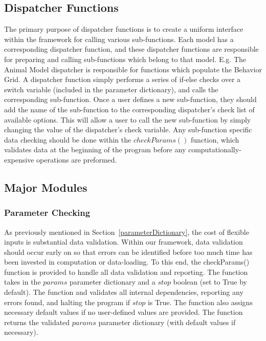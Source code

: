 \subsection{Dispatcher Functions}
\label{dispatcherFunctions}
The primary purpose of dispatcher functions is to create a uniform interface within the framework for calling various sub-functions.  Each model has a corresponding dispatcher function, and these dispatcher functions are responsible for preparing and calling sub-functions which belong to that model.  E.g. The Animal Model dispatcher is responsible for functions which populate the Behavior Grid.  A dispatcher function simply performs a series of if-else checks over a switch variable (included in the parameter dictionary), and calls the corresponding sub-function.  Once a user defines a new sub-function, they should add the name of the sub-function to the corresponding dispatcher's check list of available options.  This will allow a user to call the new sub-function by simply changing the value of the dispatcher's check variable.  Any sub-function specific data checking should be done within the $checkParams()$ function, which validates data at the beginning of the program before any computationally-expensive operations are preformed.


\subsection{Major Modules}
\label{majorModules}
\subsubsection{Parameter Checking}
\label{checkParams}
As previously mentioned in Section~\ref{parameterDictionary}, the cost of flexible inputs is substantial data validation.  Within our framework, data validation should occur early on so that errors can be identified before too much time has been invested in computation or data-loading.  To this end, the checkParams() function is provided to handle all data validation and reporting.  The function takes in the $params$ parameter dictionary and a $stop$ boolean (set to True by default).  The function and validates all internal dependencies, reporting any errors found, and halting the program if $stop$ is True.  The function also assigns necessary default values if no user-defined values are provided.  The function returns the validated $params$ parameter dictionary (with default values if necessary).  

